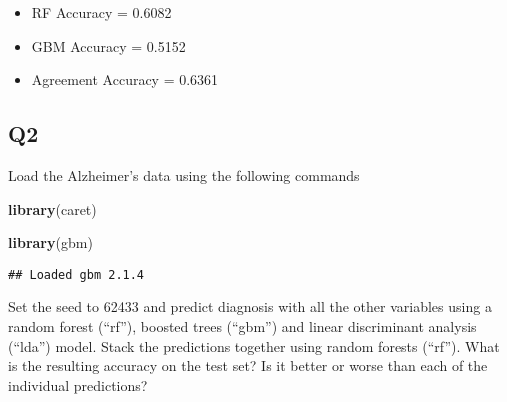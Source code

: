 \documentclass[]{article}
\newenvironment{Shaded}{\begin{snugshade}}{\end{snugshade}}
\newcommand{\KeywordTok}[1]{\textcolor[rgb]{0.13,0.29,0.53}{\textbf{#1}}}
\newcommand{\DataTypeTok}[1]{\textcolor[rgb]{0.13,0.29,0.53}{#1}}
\newcommand{\DecValTok}[1]{\textcolor[rgb]{0.00,0.00,0.81}{#1}}
\newcommand{\StringTok}[1]{\textcolor[rgb]{0.31,0.60,0.02}{#1}}
\newcommand{\OperatorTok}[1]{\textcolor[rgb]{0.81,0.36,0.00}{\textbf{#1}}}
\newcommand{\NormalTok}[1]{#1}
\begin{document}
\begin{itemize}
\item
  RF Accuracy = 0.6082
\item
  GBM Accuracy = 0.5152
\item
  Agreement Accuracy = 0.6361
\end{itemize}

\subsection{Q2}\label{q2}

Load the Alzheimer's data using the following commands

\begin{Shaded}
\begin{Highlighting}[]
\KeywordTok{library}\NormalTok{(caret)}

\KeywordTok{library}\NormalTok{(gbm)}
\end{Highlighting}
\end{Shaded}

\begin{verbatim}
## Loaded gbm 2.1.4
\end{verbatim}

\begin{Shaded}
\end{Shaded}

Set the seed to 62433 and predict diagnosis with all the other variables
using a random forest (``rf''), boosted trees (``gbm'') and linear
discriminant analysis (``lda'') model. Stack the predictions together
using random forests (``rf''). What is the resulting accuracy on the
test set? Is it better or worse than each of the individual predictions?
\end{document}
